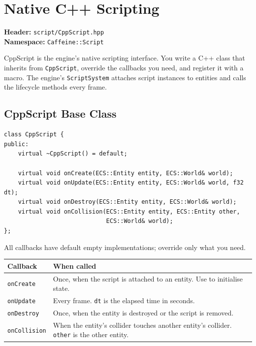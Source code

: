 \chapter{Native C++ Scripting}

\textbf{Header:} \texttt{script/CppScript.hpp}\\
\textbf{Namespace:} \texttt{Caffeine::Script}

CppScript is the engine's native scripting interface. You write a C++ class
that inherits from \texttt{CppScript}, override the callbacks you need, and
register it with a macro. The engine's \texttt{ScriptSystem} attaches script
instances to entities and calls the lifecycle methods every frame.

\section{CppScript Base Class}

\begin{lstlisting}
class CppScript {
public:
    virtual ~CppScript() = default;

    virtual void onCreate(ECS::Entity entity, ECS::World& world);
    virtual void onUpdate(ECS::Entity entity, ECS::World& world, f32 dt);
    virtual void onDestroy(ECS::Entity entity, ECS::World& world);
    virtual void onCollision(ECS::Entity entity, ECS::Entity other,
                             ECS::World& world);
};
\end{lstlisting}

All callbacks have default empty implementations; override only what you
need.

\begin{longtable}{lp{9.5cm}}
\toprule
\textbf{Callback} & \textbf{When called} \\
\midrule
\texttt{onCreate}    & Once, when the script is attached to an entity. Use to initialise state. \\
\texttt{onUpdate}    & Every frame. \texttt{dt} is the elapsed time in seconds. \\
\texttt{onDestroy}   & Once, when the entity is destroyed or the script is removed. \\
\texttt{onCollision} & When the entity's collider touches another entity's collider. \texttt{other} is the other entity. \\
\bottomrule
\end{longtable}

